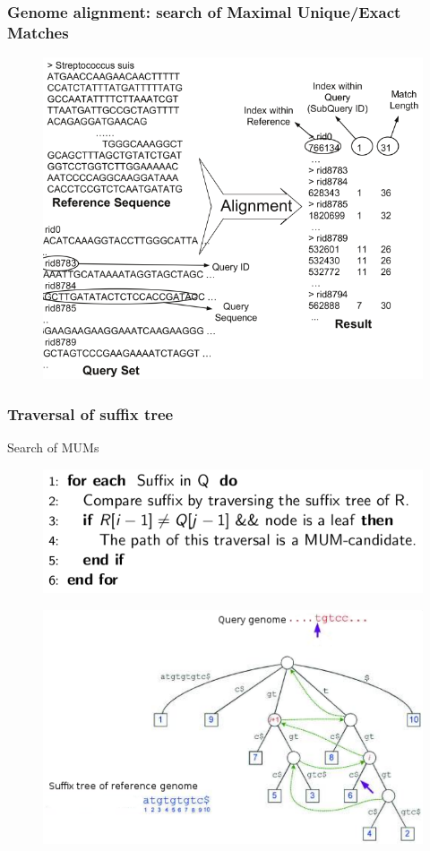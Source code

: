 \documentclass{beamer}
\begin{document}
\begin{frame}
\frametitle{Genome alignment: search of Maximal Unique/Exact Matches}
\begin{figure}\includegraphics[scale=0.35]{problem.png}\end{figure}
\end{frame}
\begin{frame}[fragile]
  \frametitle{Traversal of suffix tree}
  \begin{block}{Search of MUMs}
  \begin{figure}\includegraphics[scale=0.4]{algoritmo.png}\end{figure}
  \end{block}
  \begin{figure}\includegraphics[scale=0.4]{st-mum.pdf}\end{figure}
\end{frame}
\end{document}
